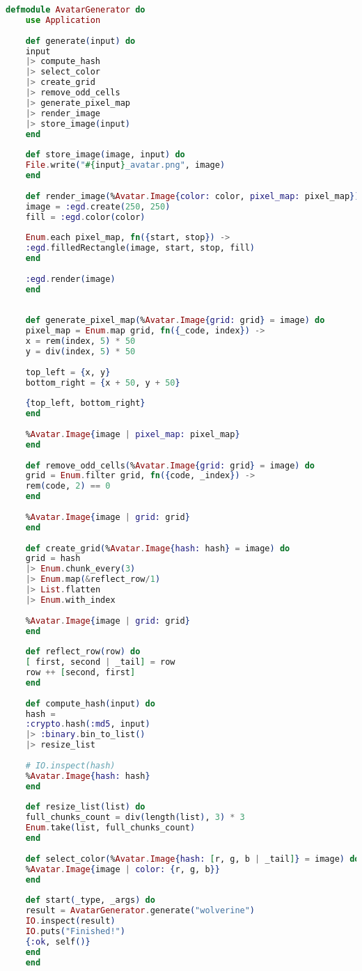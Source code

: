 \begin{lstlisting}[language=Elixir, caption={Keseluruhan Kode src/avatar.ex}]
	defmodule AvatarGenerator do
	use Application
	
	def generate(input) do
	input
	|> compute_hash
	|> select_color
	|> create_grid
	|> remove_odd_cells
	|> generate_pixel_map
	|> render_image
	|> store_image(input)
	end
	
	def store_image(image, input) do
	File.write("#{input}_avatar.png", image)
	end
	
	def render_image(%Avatar.Image{color: color, pixel_map: pixel_map}) do
	image = :egd.create(250, 250)
	fill = :egd.color(color)
	
	Enum.each pixel_map, fn({start, stop}) ->
	:egd.filledRectangle(image, start, stop, fill)
	end
	
	:egd.render(image)
	end
	
	
	def generate_pixel_map(%Avatar.Image{grid: grid} = image) do
	pixel_map = Enum.map grid, fn({_code, index}) ->
	x = rem(index, 5) * 50
	y = div(index, 5) * 50
	
	top_left = {x, y}
	bottom_right = {x + 50, y + 50}
	
	{top_left, bottom_right}
	end
	
	%Avatar.Image{image | pixel_map: pixel_map}
	end
	
	def remove_odd_cells(%Avatar.Image{grid: grid} = image) do
	grid = Enum.filter grid, fn({code, _index}) ->
	rem(code, 2) == 0
	end
	
	%Avatar.Image{image | grid: grid}
	end
	
	def create_grid(%Avatar.Image{hash: hash} = image) do
	grid = hash
	|> Enum.chunk_every(3)
	|> Enum.map(&reflect_row/1)
	|> List.flatten
	|> Enum.with_index
	
	%Avatar.Image{image | grid: grid}
	end
	
	def reflect_row(row) do
	[ first, second | _tail] = row
	row ++ [second, first]
	end
	
	def compute_hash(input) do
	hash =
	:crypto.hash(:md5, input)
	|> :binary.bin_to_list()
	|> resize_list
	
	# IO.inspect(hash)
	%Avatar.Image{hash: hash}
	end
	
	def resize_list(list) do
	full_chunks_count = div(length(list), 3) * 3
	Enum.take(list, full_chunks_count)
	end
	
	def select_color(%Avatar.Image{hash: [r, g, b | _tail]} = image) do
	%Avatar.Image{image | color: {r, g, b}}
	end
	
	def start(_type, _args) do
	result = AvatarGenerator.generate("wolverine")
	IO.inspect(result)
	IO.puts("Finished!")
	{:ok, self()}
	end
	end
\end{lstlisting}

